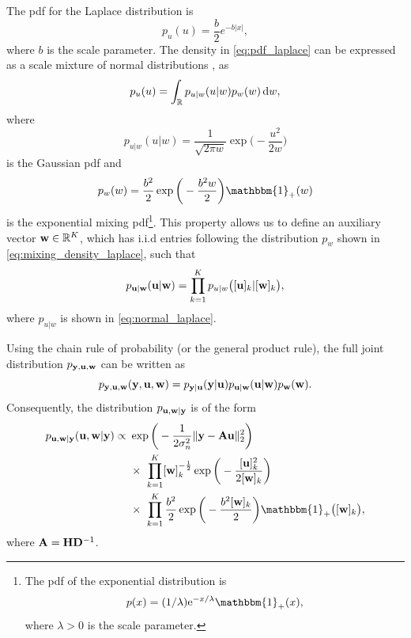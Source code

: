 \documentclass[journal]{IEEEtran}
\begin{document}
The pdf for the Laplace distribution is 
\begin{equation}\label{eq:pdf_laplace}
    p_u(u) = \frac{b}{2}e^{-b |x|},
\end{equation}
where $b$ is the scale parameter. The density in \eqref{eq:pdf_laplace} can be expressed as a scale mixture of normal distributions \cite{andrews1974scale}, as 
\begin{equation}
    p_u(u) = \int_{\mathbb{R}} p_{u|w}(u|w) p_w(w) \,\mathrm{d} w,
\end{equation}
where
\begin{equation}\label{eq:normal_laplace}
    p_{u|w}(u|w) = \frac{1}{\sqrt{2 \pi w}} \exp\bigg(-\frac{u^2}{2 w}\bigg)
\end{equation}
is the Gaussian pdf and  
\begin{equation}\label{eq:mixing_density_laplace}
    p_w(w) = \frac{b^2}{2}\exp\bigg(-\frac{b^2 w}{2}\bigg) \mathbbm{1}_{+}(w)
\end{equation}
is the exponential mixing pdf\footnote{The pdf of the exponential distribution is \begin{equation*} p(x) = (1/\lambda) \mathrm{e}^{-x/\lambda} \mathbbm{1}_{+}(x), \end{equation*} where $\lambda > 0$ is the scale parameter.}. This property allows us to define an auxiliary vector ${\bf{w}} \in \mathbb{R}^K$, which has i.i.d entries following the distribution $p_w$ shown in \eqref{eq:mixing_density_laplace}, such that 
\begin{equation}\label{eq:aux_var_property_laplace}
    p_{{\bf{u}} | {\bf{w}}}({\bf{u}} | {\bf{w}}) = \prod_{k=1}^{K} p_{u|w}\big([{\bf{u}}]_k | [{\bf{w}}]_k\big),
\end{equation}
where $p_{u|w}$ is shown in \eqref{eq:normal_laplace}.

Using the chain rule of probability (or the general product rule), the full joint distribution $p_{{\bf{y}}, {\bf{u}}, {\bf{w}}}$ can be written as 
\begin{equation}\label{eq:full_joint_distribution_laplace}
    p_{{\bf{y}}, {\bf{u}}, {\bf{w}}}({\bf{y}}, {\bf{u}}, {\bf{w}}) = p_{{\bf{y}} | {\bf{u}}}({\bf{y}} | {\bf{u}}) p_{{\bf{u}} | {\bf{w}}}({\bf{u}} | {\bf{w}}) p_{{\bf{w}}}({\bf{w}}).
\end{equation}
Consequently, the distribution $p_{{\bf{u}}, {\bf{w}} | {\bf{y}}}$ is of the form
\begin{align}\label{eq:conditional_joint_distribution_laplace}
    p_{\M u, \M w | \M y}(\M u, \M w | \M y) \propto \ &\exp\bigg(-\frac{1}{2 \sigma_n^2} \|\M y - \M A \M u \|_{2}^{2}\bigg) \nonumber \\
    &\times \ \prod_{k=1}^{K}[\M w]_k^{-\frac{1}{2}} \exp\bigg(-\frac{[\M u]_k^2}{2 [\M w]_k}\bigg) \nonumber \\
    &\times \ \prod_{k=1}^{K} \frac{b^2}{2}\exp\bigg(-\frac{b^2 [\M w]_k}{2}\bigg) \mathbbm{1}_{+}\big([\M w]_k\big),
\end{align}
where ${\bf{A}} = {\bf{H}} {\bf{D}}^{-1}$. 
\end{document}
